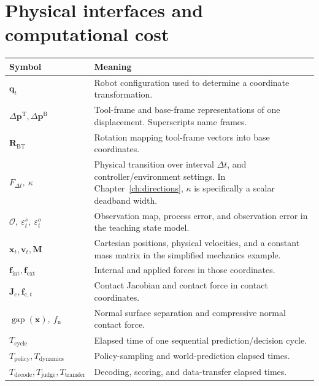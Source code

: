 \section*{Physical interfaces and computational cost}
\begin{longtable}{@{}p{40mm}p{116mm}@{}}
\toprule Symbol & Meaning\\\midrule\endhead
$\mathbf q_t$ & Robot configuration used to determine a coordinate transformation.\\
$\Delta\mathbf p^{\mathrm T},\Delta\mathbf p^{\mathrm B}$ & Tool-frame and base-frame representations of one displacement. Superscripts name frames.\\
$\mathbf R_{\mathrm{BT}}$ & Rotation mapping tool-frame vectors into base coordinates.\\
$F_{\Delta t},\ \kappa$ & Physical transition over interval $\Delta t$, and controller/environment settings. In Chapter~\ref{ch:directions}, $\kappa$ is specifically a scalar deadband width.\\
$\mathcal O,\ \varepsilon_t^s,\ \varepsilon_t^o$ & Observation map, process error, and observation error in the teaching state model.\\
$\mathbf x_t,\mathbf v_t,\mathbf M$ & Cartesian positions, physical velocities, and a constant mass matrix in the simplified mechanics example.\\
$\mathbf f_{\mathrm{int}},\mathbf f_{\mathrm{ext}}$ & Internal and applied forces in those coordinates.\\
$\mathbf J_{\mathrm c},\mathbf f_{\mathrm c,t}$ & Contact Jacobian and contact force in contact coordinates.\\
$\operatorname{gap}(\mathbf x),\ f_{\mathrm n}$ & Normal surface separation and compressive normal contact force.\\
$T_{\mathrm{cycle}}$ & Elapsed time of one sequential prediction/decision cycle.\\
$T_{\mathrm{policy}},T_{\mathrm{dynamics}}$ & Policy-sampling and world-prediction elapsed times.\\
$T_{\mathrm{decode}},T_{\mathrm{judge}},T_{\mathrm{transfer}}$ & Decoding, scoring, and data-transfer elapsed times.\\
\bottomrule
\end{longtable}


